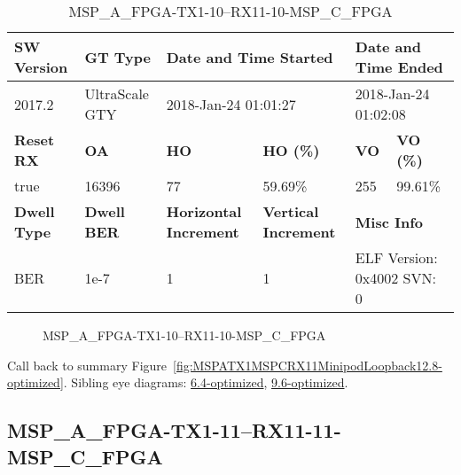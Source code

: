 \begin{table}[h]
\centering
\caption{MSP\_A\_FPGA-TX1-10--RX11-10-MSP\_C\_FPGA}
\label{tab:MSPAFPGATX110RX1110MSPCFPGA12.8-optimized}
\begin{tabular}{@{}|l|l|l|l|l|l|@{}}
\toprule
\textbf{SW Version}                & \textbf{GT Type}   & \multicolumn{2}{l|}{\textbf{Date and Time Started}}            & \multicolumn{2}{l|}{\textbf{Date and Time Ended}}        \\ \midrule
2017.2                       & UltraScale GTY          & \multicolumn{2}{l|}{2018-Jan-24 01:01:27}                   & \multicolumn{2}{l|}{2018-Jan-24 01:02:08}               \\ \midrule
\textbf{Reset RX}                  & \textbf{OA} & \textbf{HO}   & \textbf{HO (\%)} & \textbf{VO} & \textbf{VO (\%)} \\ \midrule
true & 16396        & 77          & 59.69\%        & 255        & 99.61\%       \\ \midrule
\textbf{Dwell Type}                & \textbf{Dwell BER} & \textbf{Horizontal Increment} & \textbf{Vertical Increment}    & \multicolumn{2}{l|}{\textbf{Misc Info}}                  \\ \midrule
BER                            & 1e-7        & 1        & 1           & \multicolumn{2}{l|}{ELF Version: 0x4002 SVN: 0}                         \\ \bottomrule
\end{tabular}
\end{table}

\begin{figure}[h]
\caption{MSP\_A\_FPGA-TX1-10--RX11-10-MSP\_C\_FPGA} \label{fig:MSPAFPGATX110RX1110MSPCFPGA12.8-optimized}
\end{figure}

Call back to summary Figure~\ref{fig:MSPATX1MSPCRX11MinipodLoopback12.8-optimized}.
Sibling eye diagrams: \hyperref[sec:MSPAFPGATX110RX1110MSPCFPGA6.4-optimized]{6.4-optimized}, \hyperref[sec:MSPAFPGATX110RX1110MSPCFPGA9.6-optimized]{9.6-optimized}.

\clearpage
\newpage


\subsection{MSP\_A\_FPGA-TX1-11--RX11-11-MSP\_C\_FPGA}\label{sec:MSPAFPGATX111RX1111MSPCFPGA12.8-optimized}

